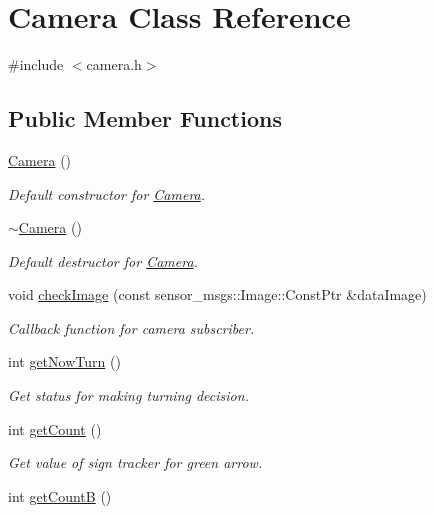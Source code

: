 \hypertarget{class_camera}{}\section{Camera Class Reference}
\label{class_camera}


{\ttfamily \#include $<$camera.\+h$>$}

\subsection*{Public Member Functions}
\begin{DoxyCompactItemize}
\item 
\mbox{\hyperlink{class_camera_a01f94c3543f56ede7af49dc778f19331}{Camera}} ()
\begin{DoxyCompactList}\small\item\em Default constructor for \mbox{\hyperlink{class_camera}{Camera}}. \end{DoxyCompactList}\item 
\mbox{\hyperlink{class_camera_ad1897942d0ccf91052386388a497349f}{$\sim$\+Camera}} ()
\begin{DoxyCompactList}\small\item\em Default destructor for \mbox{\hyperlink{class_camera}{Camera}}. \end{DoxyCompactList}\item 
void \mbox{\hyperlink{class_camera_a0b67f2af6df1296fb25f3b0e160cc99f}{check\+Image}} (const sensor\+\_\+msgs\+::\+Image\+::\+Const\+Ptr \&data\+Image)
\begin{DoxyCompactList}\small\item\em Callback function for camera subscriber. \end{DoxyCompactList}\item 
int \mbox{\hyperlink{class_camera_a6b27e3016f42ac8af96601426e009c1b}{get\+Now\+Turn}} ()
\begin{DoxyCompactList}\small\item\em Get status for making turning decision. \end{DoxyCompactList}\item 
int \mbox{\hyperlink{class_camera_ac33d3b84891fdc56e4cce90e59be1905}{get\+Count}} ()
\begin{DoxyCompactList}\small\item\em Get value of sign tracker for green arrow. \end{DoxyCompactList}\item 
int \mbox{\hyperlink{class_camera_ae345bbfa5530387acf5143a3e70bf103}{get\+CountB}} ()

\end{DoxyCompactItemize}
